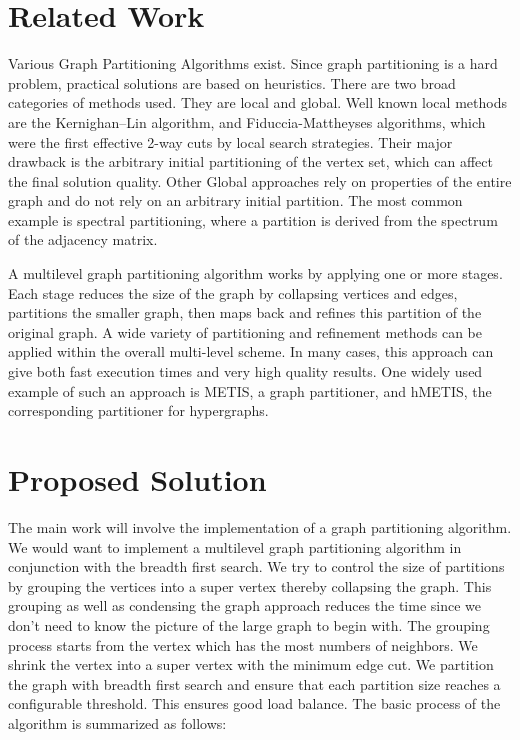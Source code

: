 \documentclass[10pt]{article}
\begin{document}
\begin{multicols}{2}
  \section{Related Work}
  Various Graph Partitioning Algorithms exist. Since graph partitioning is a hard problem, practical solutions are based on heuristics. There are two broad categories of methods used. They are local and global. Well known local methods are the Kernighan–Lin algorithm, and Fiduccia-Mattheyses algorithms, which were the first effective 2-way cuts by local search strategies. Their major drawback is the arbitrary initial partitioning of the vertex set, which can affect the final solution quality. Other Global approaches rely on properties of the entire graph and do not rely on an arbitrary initial partition. The most common example is spectral partitioning, where a partition is derived from the spectrum of the adjacency matrix.

  A multilevel graph partitioning algorithm works by applying one or more stages. Each stage reduces the size of the graph by collapsing vertices and edges, partitions the smaller graph, then maps back and refines this partition of the original graph. A wide variety of partitioning and refinement methods can be applied within the overall multi-level scheme. In many cases, this approach can give both fast execution times and very high quality results. One widely used example of such an approach is METIS, a graph partitioner, and hMETIS, the corresponding partitioner for hypergraphs.

  
  \section{Proposed Solution}
  The main work will involve the implementation of a graph partitioning algorithm. We would want to implement a multilevel graph partitioning algorithm in conjunction with the breadth first search. We try to control the size of partitions by grouping the vertices into a super vertex thereby collapsing the graph. This grouping as well as condensing the graph approach reduces the time since we don’t need to know the picture of the large graph to begin with. The grouping process starts from the vertex which has the most numbers of neighbors. We shrink the vertex into a super vertex with the minimum edge cut. We partition the graph with breadth first search and ensure that each partition size reaches a configurable threshold. This ensures good load balance. The basic process of the algorithm is summarized as follows:



\end{multicols}
\end{document}
